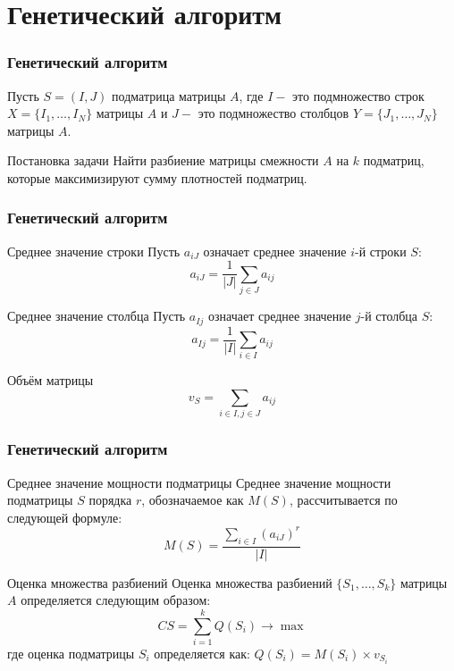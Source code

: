 \documentclass{spbseu}
\begin{document}
    \section{Генетический алгоритм}

    \begin{frame}
		\frametitle{Генетический алгоритм}
        \tableofcontents[part=4, pausesections]
        Пусть $S=(I,J)$ подматрица матрицы $A$, где $I -$ это подмножество строк $X = \{I_1, \dots, I_N\}$ матрицы $A$ и $J -$ это подмножество столбцов $Y = \{J_1, \dots, J_N\}$ матрицы $A$.
        \begin{block}{Постановка задачи}
            \justifying
            Найти разбиение матрицы смежности $A$ на $k$ подматриц, которые максимизируют сумму плотностей подматриц.
        \end{block}
	\end{frame}

    \begin{frame}
		\frametitle{Генетический алгоритм}
        \vspace{-10pt}
        \begin{block}{Среднее значение строки}
        Пусть $a_{iJ}$ означает среднее значение $i$-й строки $S$:
            \[ a_{iJ} = \dfrac{1}{|J|}\sum_{j \in J} a_{ij} \]
        \end{block}
        \begin{block}{Среднее значение столбца}
        Пусть $a_{Ij}$ означает среднее значение $j$-й столбца $S$:
            \[ a_{Ij} = \dfrac{1}{|I|}\sum_{i \in I} a_{ij} \]
        \end{block}
        \begin{block}{Объём матрицы}
            \[ v_{S} = \sum_{i \in I, j \in J} a_{ij} \]
        \end{block}
    \end{frame}
    
    \begin{frame}
		\frametitle{Генетический алгоритм}
        \begin{block}{Среднее значение мощности подматрицы}
            Среднее значение мощности подматрицы $S$ порядка $r$, обозначаемое как $M(S)$, рассчитывается по следующей формуле:
            \[ M(S) = \dfrac{\sum_{i \in I}(a_{iJ})^r}{|I|}\]
        \end{block}
        \begin{block}{Оценка множества разбиений}
            Оценка множества разбиений $\{S_1, \dots, S_k\}$ матрицы $A$ определяется следующим образом:
            \[ CS = \sum_{i=1}^{k} Q(S_i) \longrightarrow \max \]
            где оценка подматрицы $S_i$ определяется как: $Q(S_i) = M(S_i) \times v_{S_i}$
        \end{block}
    \end{frame}
    
\end{document}
